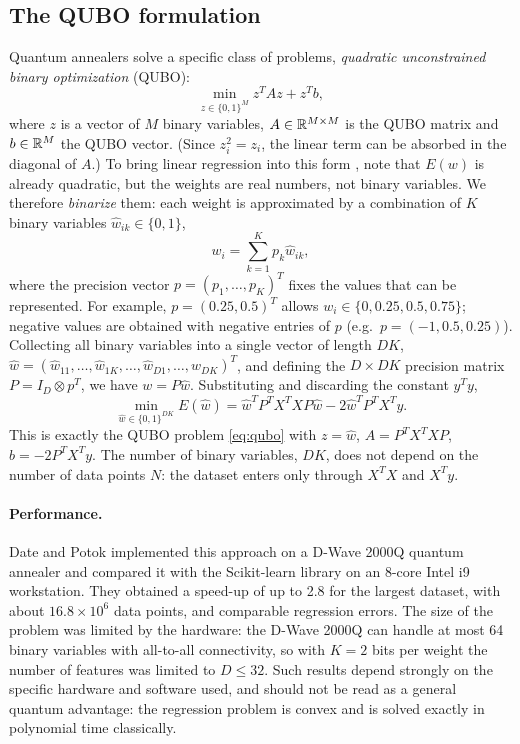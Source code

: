 \subsection{The QUBO formulation}
Quantum annealers solve a specific class of problems, \emph{quadratic unconstrained binary optimization} (QUBO):
\begin{equation}\label{eq:qubo}
  \min_{z\in\{0,1\}^M}z^TAz+z^Tb,
\end{equation}
where $z$ is a vector of $M$ binary variables, $A\in\mathbb R^{M\times M}$ is the QUBO matrix and $b\in\mathbb R^M$ the QUBO vector. (Since $z_i^2=z_i$, the linear term can be absorbed in the diagonal of $A$.)
To bring linear regression into this form \cite{DatePotok2021}, note that $E(w)$ is already quadratic, but the weights are real numbers, not binary variables. We therefore \emph{binarize} them: each weight is
approximated by a combination of $K$ binary variables $\hat w_{ik}\in\{0,1\}$,
\begin{equation}
  w_i=\sum_{k=1}^Kp_k\hat w_{ik},
\end{equation}
where the precision vector $p=(p_1,\dots,p_K)^T$ fixes the values that can be represented. For example, $p=(0.25,0.5)^T$ allows $w_i\in\{0,0.25,0.5,0.75\}$; negative values are obtained with negative entries of $p$
(e.g.\ $p=(-1,0.5,0.25)$). Collecting all binary variables into a single vector of length $DK$, $\hat w=(\hat w_{11},\dots,\hat w_{1K},\dots,\hat w_{D1},\dots,\hat w_{DK})^T$, and defining the $D\times DK$ precision
matrix $P=I_D\otimes p^T$, we have $w=P\hat w$. Substituting and discarding the constant $y^Ty$,
\begin{equation}
  \min_{\hat w\in\{0,1\}^{DK}}E(\hat w)=\hat w^TP^TX^TXP\hat w-2\hat w^TP^TX^Ty.
\end{equation}
This is exactly the QUBO problem \cref{eq:qubo} with $z=\hat w$, $A=P^TX^TXP$, $b=-2P^TX^Ty$. The number of binary variables, $DK$, does not depend on the number of data points $N$: the dataset enters only through
$X^TX$ and $X^Ty$.

\paragraph{Performance.} Date and Potok \cite{DatePotok2021} implemented this approach on a D-Wave 2000Q quantum annealer and compared it with the Scikit-learn library on an 8-core Intel i9 workstation. They obtained a
speed-up of up to 2.8 for the largest dataset, with about $16.8\times10^6$ data points, and comparable regression errors. The size of the problem was limited by the hardware: the D-Wave 2000Q can handle at most 64
binary variables with all-to-all connectivity, so with $K=2$ bits per weight the number of features was limited to $D\le32$. Such results depend strongly on the specific hardware and software used, and should not be
read as a general quantum advantage: the regression problem is convex and is solved exactly in polynomial time classically.

